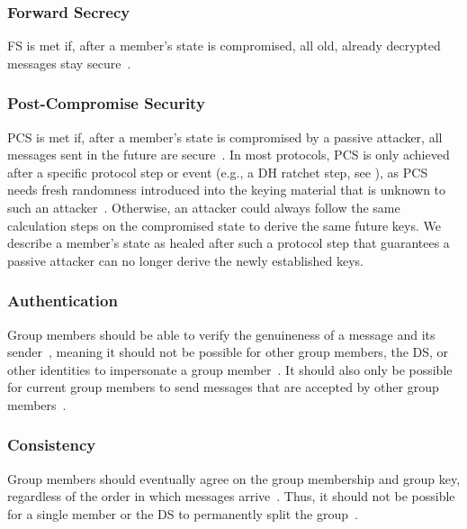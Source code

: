 \documentclass[conference]{IEEEtran}
\begin{document}
\subsubsection{Forward Secrecy}\label{sec:fs}
\ac{FS} is met if, after a member's state is compromised, all old, already decrypted messages stay secure~\cite{barnesMessagingLayerSecurity2023,weidnerKeyAgreementDecentralized2021}.

\subsubsection{Post-Compromise Security}\label{sec:pcs}
\ac{PCS} is met if, after a member's state is compromised by a passive attacker, all messages sent in the future are secure~\cite{weidnerKeyAgreementDecentralized2021,beurdoucheMessagingLayerSecurity2025}.
In most protocols, \ac{PCS} is only achieved after a specific protocol step or event (e.g., a \ac{DH} ratchet step, see ), as \ac{PCS} needs fresh randomness introduced into the keying material that is unknown to such an attacker~\cite{cohn-gordonPostcompromiseSecurity2016}.
Otherwise, an attacker could always follow the same calculation steps on the compromised state to derive the same future keys.
We describe a member's state as healed after such a protocol step that guarantees a passive attacker can no longer derive the newly established keys.

\subsubsection{Authentication}
Group members should be able to verify the genuineness of a message and its sender~\cite{beurdoucheMessagingLayerSecurity2025,weidnerKeyAgreementDecentralized2021}, meaning it should not be possible for other group members, the \ac{DS}, or other identities to impersonate a group member~\cite{roslerMoreLessEndtoEnd2018,weidnerKeyAgreementDecentralized2021,alwenInsiderSecurityMLS2022}.
It should also only be possible for current group members to send messages that are accepted by other group members~\cite{roslerMoreLessEndtoEnd2018,weidnerKeyAgreementDecentralized2021}.
\subsubsection{Consistency}
Group members should eventually agree on the group membership and group key, regardless of the order in which messages arrive~\cite{weidnerKeyAgreementDecentralized2021}.
Thus, it should not be possible for a single member or the \ac{DS} to permanently split the group~\cite{barnesMessagingLayerSecurity2023,beurdoucheMessagingLayerSecurity2025}.
\end{document}
